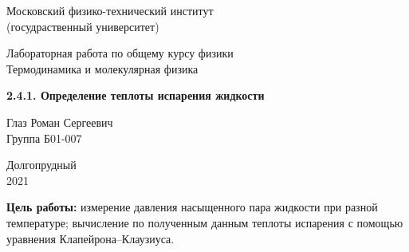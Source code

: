 \documentclass[a4paper, 12pt]{article} %
\begin{document}


\begin{titlepage}

    \newpage
    \begin{center}
        \normalsize Московский физико-технический институт \\(госудраственный университет)
    \end{center}

    \vspace{6em}

    \begin{center}
        \Large Лабораторная работа по общему курсу физики\\Термодинамика и молекулярная физика
    \end{center}

    \vspace{1em}

    \begin{center}
        \Large \textbf{2.4.1. Определение теплоты испарения жидкости }
    \end{center}

    \vspace{2em}

    \begin{center}
        \large Глаз Роман Сергеевич\\
        Группа Б01-007
    \end{center}

    \vspace{\fill}

    \begin{center}
        Долгопрудный \\2021
    \end{center}
    
\end{titlepage}



    \thispagestyle{empty}
    \newpage
    \tableofcontents
    \newpage
    \setcounter{page}{1}



\textbf{Цель работы:} измерение давления насыщенного пара жидкости при разной температуре; вычисление по полученным данным теплоты испарения с помощью уравнения Клапейрона–Клаузиуса.\\
\end{document}
